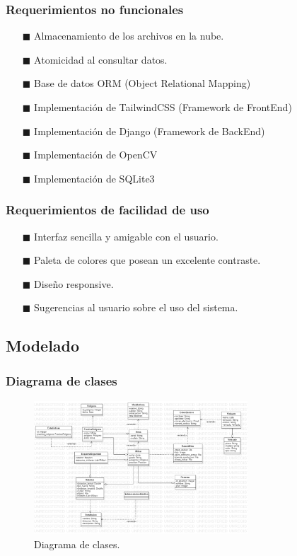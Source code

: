 \documentclass[conference]{IEEEtran}
\begin{document}
\subsubsection{Requerimientos no funcionales}
\begin{itemize}
	\item[$\blacksquare$] Almacenamiento de los archivos en la nube.
	\item[$\blacksquare$] Atomicidad al consultar datos.
	\item[$\blacksquare$] Base de datos ORM (Object Relational Mapping)
	\item[$\blacksquare$] Implementación de TailwindCSS (Framework de FrontEnd)
	\item[$\blacksquare$] Implementación de Django (Framework de BackEnd)
	\item[$\blacksquare$] Implementación de OpenCV	\item[$\blacksquare$] Implementación de SQLite3
\end{itemize}

\subsubsection{Requerimientos de facilidad de uso}
\begin{itemize}
	\item[$\blacksquare$] Interfaz sencilla y amigable con el usuario.
	\item[$\blacksquare$] Paleta de colores que posean un excelente contraste.
	\item[$\blacksquare$] Diseño responsive. 
	\item[$\blacksquare$] Sugerencias al usuario sobre el uso del sistema.
\end{itemize}

\subsection{Modelado}
\subsubsection{Diagrama de clases}
\begin{figure}[htbp]
	\centerline{\includegraphics [width=8cm, height=5cm] {fig2.png}}
	\caption{Diagrama de clases.}
\end{figure}
\end{document}

